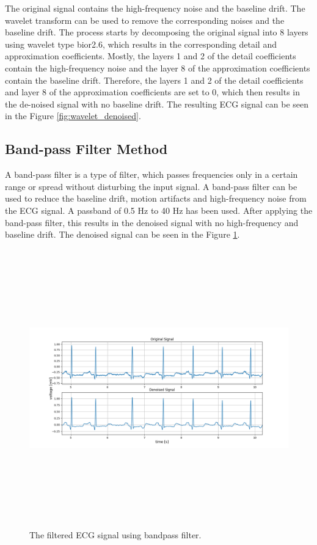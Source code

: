 The original signal contains the high-frequency noise and the baseline drift. The wavelet transform can be used to remove the corresponding noises and the baseline drift. The process starts by decomposing the original signal into 8 layers using wavelet type bior2.6, which results in the corresponding detail and approximation coefficients. Mostly, the layers 1 and 2 of the detail coefficients contain the high-frequency noise and the layer 8 of the approximation coefficients contain the baseline drift. Therefore, the layers 1 and 2 of the detail coefficients and layer 8 of the approximation coefficients are set to 0, which then results in the de-noised signal with no baseline drift. The resulting ECG signal can be seen in the Figure \ref{fig:wavelet_denoised}. 




\subsection{Band-pass Filter Method}
A band-pass filter is a type of filter, which passes frequencies only in a certain range or spread without disturbing the input signal. A band-pass filter can be used to reduce the baseline drift, motion artifacts and high-frequency noise from the ECG signal. A passband of 0.5 Hz to 40 Hz has been used. After applying the band-pass filter, this results in the denoised signal with no high-frequency and baseline drift. The denoised signal can be seen in the Figure \ref{fig:bandpass_denoised}. 

\begin{figure}[h]
	\centering
	\includegraphics[width=15cm,height=12cm,keepaspectratio=true]{images/bandpass_denoised_1}
	\caption{
		The filtered ECG signal using bandpass filter.
	}
	\label{fig:bandpass_denoised}
\end{figure}


